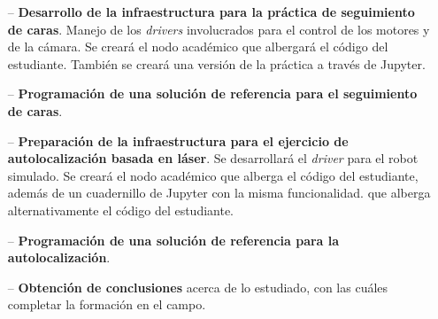 \begin{itemize}
	\item[--] \textbf{Desarrollo de la infraestructura para la práctica de seguimiento de caras}. Manejo de los \textit{drivers} involucrados para el control de los motores y de la cámara. Se creará el nodo académico que albergará el código del estudiante. También se creará una versión de la práctica a través de Jupyter.
	\item[--] \textbf{Programación de una solución de referencia para el seguimiento de caras}.
	\item[--] \textbf{Preparación de la infraestructura para el ejercicio de autolocalización basada en láser}. Se desarrollará el \textit{driver} para el robot simulado. Se creará el nodo académico que alberga el código del estudiante, además de un cuadernillo de Jupyter con la misma funcionalidad.
que alberga alternativamente el código del estudiante.
	\item[--] \textbf{Programación de una solución de referencia para la autolocalización}.
	\item[--] \textbf{Obtención de conclusiones} acerca de lo estudiado, con las cuáles completar la formación en el campo.
\end{itemize}